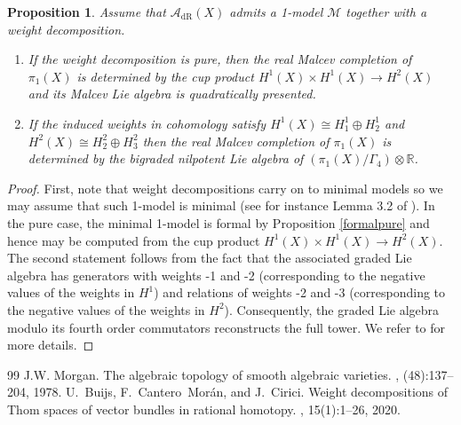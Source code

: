 \documentclass[10pt,a4paper]{amsart}
\newtheorem{prop}{Proposition}
\newcommand{\Aa}{\mathcal{A}}
\newcommand{\Mm}{\mathcal{M}}
\newcommand{\RR}{\mathbb{R}}
\newcommand{\dR}{\mathrm{dR}}
\begin{document}
\begin{prop}Assume that $\Aa_{\dR}(X)$ admits a 1-model $\Mm$ together with a weight decomposition.
\begin{enumerate}
 \item If the weight decomposition is pure, then the real Malcev completion of $\pi_1(X)$ is determined
 by the cup product $H^1(X)\times H^1(X)\to H^2(X)$ and its Malcev Lie algebra is quadratically presented.
 \item If the induced weights in cohomology satisfy
 $H^1(X)\cong H^1_1\oplus H^1_2$ and $H^2(X)\cong H^2_2\oplus H^2_3$
 then the real Malcev completion of $\pi_1(X)$ is determined by the bigraded nilpotent Lie algebra of $(\pi_1(X)/\Gamma_4)\otimes\RR$.
\end{enumerate}
\end{prop}

\begin{proof}
First, note that weight decompositions carry on to minimal models so we may assume that such 1-model is minimal (see for instance Lemma 3.2 of \cite{Thom}).
In the pure case, the minimal 1-model is formal by Proposition \ref{formalpure} and hence may be computed from the cup product $H^1(X)\times H^1(X)\to H^2(X)$. The second statement follows from the fact that
the associated graded Lie algebra has generators with weights -1 and -2 (corresponding to the negative values of the weights in $H^1$) and relations of weights -2 and -3 (corresponding to the negative values of the weights in $H^2$). Consequently, the graded Lie algebra modulo its fourth order commutators reconstructs the full tower. We refer to \cite{Morgan} for more details.
\end{proof}

\begin{thebibliography}{99}
 J.W. Morgan. \newblock The algebraic topology of smooth algebraic varieties. , (48):137--204, 1978.
 U.~Buijs, F.~Cantero~Mor\'an, and J.~Cirici. \newblock Weight decompositions of {T}hom spaces of vector bundles in rational homotopy. , 15(1):1--26, 2020.
\end{thebibliography}
\end{document}
